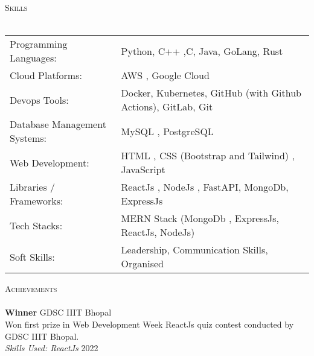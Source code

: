 \documentclass[a4paper]{article}
\newcommand{\lineunder} {
    \vspace*{-8pt} \\
    \hspace*{-18pt} \hrulefill \\
}
\newcommand{\header} [1] {
    {\hspace*{-18pt}\vspace*{6pt} \textsc{#1}}
    \vspace*{-6pt} \lineunder
}
\begin{document}
\header{Skills}
\vspace{2mm}
\begin{tabular}{ l l }
	Programming Languages: & Python, C++ ,C, Java, GoLang, Rust  \\
	\vspace{1mm}
	Cloud Platforms:        & AWS , Google Cloud  \\
	Devops Tools:  & Docker, Kubernetes, GitHub (with Github Actions), GitLab, Git \\
	Database Management Systems: & MySQL , PostgreSQL \\ 
	Web Development:       & HTML , CSS (Bootstrap and Tailwind) , JavaScript   \\
	Libraries / Frameworks: & ReactJs , NodeJs , FastAPI, MongoDb, ExpressJs        \\
	Tech Stacks:             & MERN Stack (MongoDb , ExpressJs, ReactJs, NodeJs) \\
	Soft Skills:           &  Leadership, Communication Skills, Organised  \\
	
\end{tabular}


\vspace{2mm}
\header{Achievements}
\textbf{Winner} \hfill GDSC IIIT Bhopal\\
Won first prize in Web Development Week ReactJs quiz contest conducted by GDSC IIIT Bhopal.\\
{\textit {Skills Used: ReactJs}}  \hfill 2022\\
\end{document}

